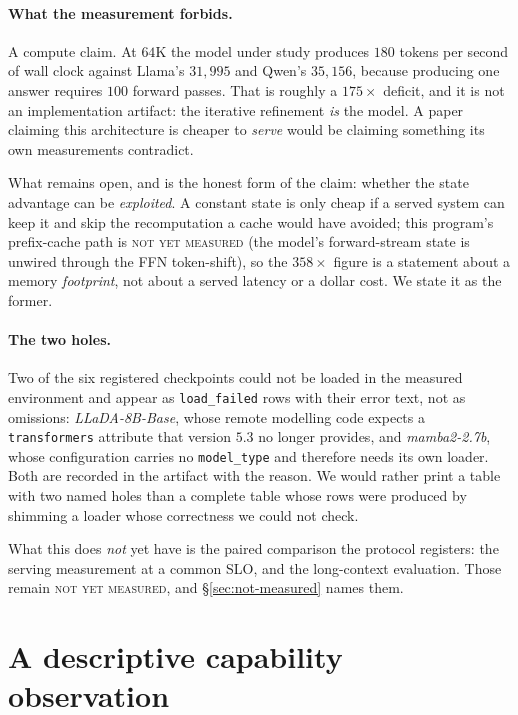 \documentclass[11pt]{article}
\newcommand{\notrun}{\textsc{not yet measured}}
\begin{document}
\paragraph{What the measurement forbids.} A compute claim. At $64$K the model under study
produces $180$ tokens per second of wall clock against Llama's $31{,}995$ and Qwen's
$35{,}156$, because producing one answer requires $100$ forward passes. That is roughly a
$175\times$ deficit, and it is not an implementation artifact: the iterative refinement
\emph{is} the model. A paper claiming this architecture is cheaper to \emph{serve} would be
claiming something its own measurements contradict.

What remains open, and is the honest form of the claim: whether the state advantage can be
\emph{exploited}. A constant state is only cheap if a served system can keep it and skip the
recomputation a cache would have avoided; this program's prefix-cache path is
\textsc{not yet measured} (the model's forward-stream state is unwired through the FFN
token-shift), so the $358\times$ figure is a statement about a memory \emph{footprint}, not
about a served latency or a dollar cost. We state it as the former.

\paragraph{The two holes.}
\label{sec:efficiency-holes}
Two of the six registered checkpoints could not be loaded in the measured environment and
appear as \texttt{load\_failed} rows with their error text, not as omissions:
\emph{LLaDA-8B-Base}, whose remote modelling code expects a \texttt{transformers} attribute
that version $5.3$ no longer provides, and \emph{mamba2-2.7b}, whose configuration carries
no \texttt{model\_type} and therefore needs its own loader. Both are recorded in the
artifact with the reason. We would rather print a table with two named holes than a complete
table whose rows were produced by shimming a loader whose correctness we could not check.

What this does \emph{not} yet have is the paired comparison the protocol registers: the
serving measurement at a common SLO, and the long-context evaluation. Those remain
\notrun{}, and \S\ref{sec:not-measured} names them.

\section{A descriptive capability observation}
\label{sec:descriptive}
\end{document}
